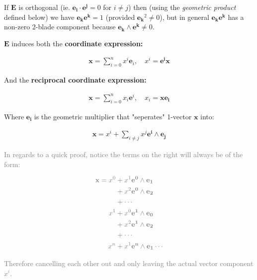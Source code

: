\documentclass[a4paper]{book}
\numberwithin{equation}{chapter}
\begin{document}
If $\mathbf{E}$ is orthogonal (ie. $\mathbf{e_i \cdot e^j}=0$ for $i\ne j$) 
then (using the \emph{geometric product} defined below) we have 
$\mathbf{e_k}\mathbf{e^k} = 1$ (provided $\mathbf{e_k}^2 \ne 0$), 
but in general $\mathbf{e_k e^k}$ has a non-zero 2-blade component because 
$\mathbf{e_k \wedge e^k} \ne 0$.

 \vspace{\baselineskip}
 
$\mathbf{E}$ induces both the \textbf{coordinate expression:}

\begin{align*}
    \mathbf{x} = \sum_{i=0}^n x^i \mathbf{e}_i, \quad x^i = \mathbf{e^i}\mathbf{x}
\end{align*}

And the \textbf{reciprocal coordinate expression:}

\begin{align*}
    \mathbf{x} = \sum_{i=0}^n x_i \mathbf{e}^i, \quad x_i = \mathbf{x}\mathbf{e_i}
\end{align*}

Where $\mathbf{e_i}$ is the geometric multiplier that 
"seperates" 1-vector $\mathbf{x}$ into:

\begin{align*}
    \mathbf{x}=x^i + \sum_{i \ne j} x^j \mathbf{e^i} \wedge \mathbf{e_j}
\end{align*}

\textcolor{gray}{In regards to a quick proof, notice the terms on the right
will always be of the form:}

\begin{align*}
   \color{gray} \mathbf{x} = x^0 &\color{gray}+x^1 \mathbf{e^0} \wedge \mathbf{e_1} \\
    &\color{gray}+ x^2 \mathbf{e^0} \wedge \mathbf{e_2} \\
    &\color{gray}+ \cdots \\
    \color{gray}x^1 &\color{gray}+ \textbf{}x^0 \mathbf{e^1} \wedge \mathbf{e_0} \\
    &\color{gray}+ x^2 \mathbf{e^1} \wedge \mathbf{e_2} \\
    &\color{gray}+ \cdots \\
    \color{gray}x^n &\color{gray}+ x^1 \mathbf{e^n} \wedge \mathbf{e_1} \cdots 
\end{align*}

\textcolor{gray}{Therefore cancelling each other out and only leaving the actual
vector component $x^i$.}

 \vspace{\baselineskip}
\end{document}
